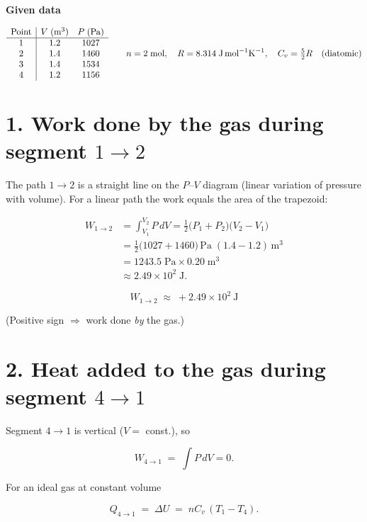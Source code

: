 \documentclass[12pt]{article}
\theoremstyle{definition} %
\theoremstyle{plain} %
\begin{document}
\textbf{Given data}

\[
\begin{array}{c|cc}
\text{Point} & V\;(\text{m}^3) & P\;(\text{Pa}) \\ \hline
1 & 1.2 & 1027 \\
2 & 1.4 & 1460 \\
3 & 1.4 & 1534 \\
4 & 1.2 & 1156
\end{array}
\qquad
n = 2\;\text{mol}, \quad
R = 8.314\;\text{J\,mol}^{-1}\text{K}^{-1}, \quad
C_v = \tfrac{5}{2}R\quad(\text{diatomic})
\]

\section*{1. Work done by the gas during segment $1\rightarrow2$}

The path $1\rightarrow2$ is a straight line on the $P$–$V$ diagram  
(linear variation of pressure with volume).  
For a linear path the work equals the area of the trapezoid:

\[
\begin{aligned}
W_{1\rightarrow2}
      &= \int_{V_1}^{V_2} P\,dV
      = \tfrac{1}{2}\bigl(P_1 + P_2\bigr)\bigl(V_2 - V_1\bigr) \\[6pt]
      &= \tfrac{1}{2}\bigl(1027 + 1460\bigr)\,\text{Pa}\;(1.4 - 1.2)\,\text{m}^3 \\[6pt]
      &= 1243.5\;\text{Pa}\times 0.20\;\text{m}^3 \\[4pt]
      &\approx 2.49\times10^{2}\;\text{J}.
\end{aligned}
\]

\[
\boxed{W_{1\rightarrow2} \;\approx\; +2.49 \times 10^{2}\ \text{J}}
\]

(Positive sign $\Rightarrow$ work done \emph{by} the gas.)

\section*{2. Heat added to the gas during segment $4\rightarrow1$}

Segment $4\rightarrow1$ is vertical ($V=$ const.), so

\[
W_{4\rightarrow1} \;=\; \int P\,dV = 0.
\]

For an ideal gas at constant volume

\[
Q_{4\rightarrow1} \;=\; \Delta U \;=\; nC_v\,(T_1 - T_4).
\]
\end{document}
